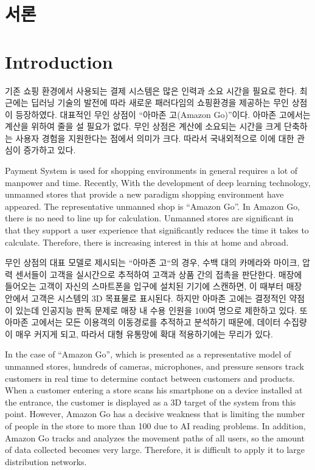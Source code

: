 \documentclass[smallextended]{svjour3}       %
\begin{document}
\def\spacingset#1{\renewcommand{\baselinestretch}%
{#1}\small\normalsize} \spacingset{1}


\hypertarget{uxc11cuxb860}{%
\section{서론}\label{uxc11cuxb860}}

\hypertarget{introduction}{%
\section{Introduction}\label{introduction}}

기존 쇼핑 환경에서 사용되는 결제 시스템은 많은 인력과 소요 시간을 필요로
한다. 최근에는 딥러닝 기술의 발전에 따라 새로운 패러다임의 쇼핑환경을
제공하는 무인 상점이 등장하였다. 대표적인 무인 상점이 ``아마존 고(Amazon
Go)''이다. 아마존 고에서는 계산을 위하여 줄을 설 필요가 없다. 무인
상점은 계산에 소요되는 시간을 크게 단축하는 사용자 경험을 지원한다는
점에서 의미가 크다. 따라서 국내외적으로 이에 대한 관심이 증가하고
있다\cite{wankhede2018just}.

Payment System is used for shopping environments in general requires a
lot of manpower and time. Recently, With the development of deep
learning technology, unmanned stores that provide a new paradigm
shopping environment have appeared. The representative unmanned shop is
``Amazon Go''. In Amazon Go, there is no need to line up for
calculation. Unmanned stores are significant in that they support a user
experience that significantly reduces the time it takes to calculate.
Therefore, there is increasing interest in this at home and
abroad\cite{wankhede2018just}.

무인 상점의 대표 모델로 제시되는 ``아마존 고``의 경우, 수백 대의
카메라와 마이크, 압력 센서들이 고객을 실시간으로 추적하여 고객과 상품
간의 접촉을 판단한다. 매장에 들어오는 고객이 자신의 스마트폰을 입구에
설치된 기기에 스캔하면, 이 때부터 매장 안에서 고객은 시스템의 3D
목표물로 표시된다. 하지만 아마존 고에는 결정적인 약점이 있는데 인공지능
판독 문제로 매장 내 수용 인원을 100여 명으로 제한하고 있다. 또 아마존
고에서는 모든 이용객의 이동경로를 추적하고 분석하기 때문에, 데이터
수집량이 매우 커지게 되고, 따라서 대형 유통망에 확대 적용하기에는 무리가
있다.

In the case of ``Amazon Go'', which is presented as a representative
model of unmanned stores, hundreds of cameras, microphones, and pressure
sensors track customers in real time to determine contact between
customers and products. When a customer entering a store scans his
smartphone on a device installed at the entrance, the customer is
displayed as a 3D target of the system from this point. However, Amazon
Go has a decisive weakness that is limiting the number of people in the
store to more than 100 due to AI reading problems. In addition, Amazon
Go tracks and analyzes the movement paths of all users, so the amount of
data collected becomes very large. Therefore, it is difficult to apply
it to large distribution networks.
\end{document}
